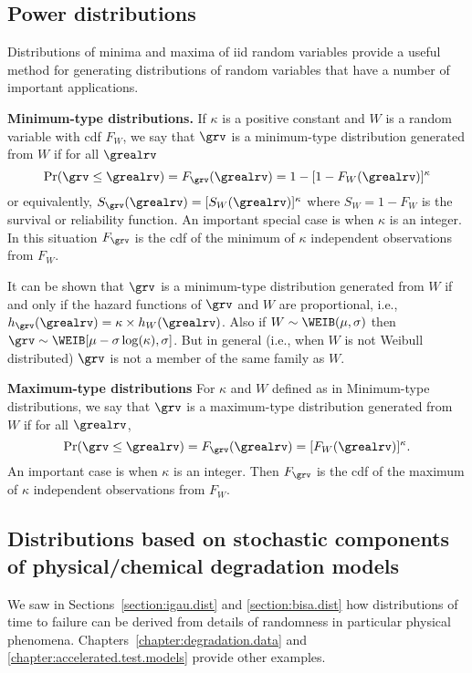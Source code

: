 \subsection{Power distributions}
\label{section:power.dist}
Distributions of minima and maxima of iid random variables provide a
useful method for generating distributions of random variables that
have a number of important applications.

{\bf Minimum-type distributions.}
If ${\kappa}$ is a positive constant and $W$ is a random
variable with cdf $F_{W}$,
we say that $\grv$ is a minimum-type
distribution generated from $W$ if for all $\grealrv$
\begin{displaymath}
\Pr(\grv \le \grealrv)=F_{\grv}(\grealrv)=1-[1 - F_{W}(\grealrv)]^{\kappa}
\end{displaymath}
or equivalently, $S_{\grv}(\grealrv)=[S_{W}(\grealrv)]^{\kappa}$
where $S_{W}=1 - F_{W}$ is the survival or reliability function.  An
important special case is when $\kappa$ is an integer. In this situation
$F_{\grv}$ is the cdf of the minimum of ${\kappa}$ independent
observations from $F_{W}$.


It can be shown that $\grv$ is a minimum-type distribution generated
from $W$ if and only if the hazard functions of $\grv$ and $W$ are
proportional, i.e., $h_{\grv}(\grealrv)=\kappa \times h_{W}(\grealrv)$.
Also if $W \sim \WEIB(\mu, \sigma)$ then $\grv \sim \WEIB[\mu-\sigma
\log(\kappa), \sigma]$. But in general (i.e., 
when $W$ is not Weibull distributed) $\grv$ is not a member of
the same family as $W$.

{\bf Maximum-type distributions} For $\kappa$ and $W$ defined as in
Minimum-type distributions, we say that $\grv$ is a maximum-type
distribution generated from $W$ if for all $\grealrv$,
\begin{displaymath}
\Pr(\grv \le \grealrv)=F_{\grv}(\grealrv)=[F_{W}(\grealrv)]^{\kappa}.
\end{displaymath}
An important case is when $\kappa$ is an integer. Then $F_{\grv}$ is
the cdf of the maximum of $\kappa$ independent observations from 
$F_{W}$.

\subsection{Distributions based on stochastic components of
physical/chemical degradation models} We saw in
Sections~\ref{section:igau.dist} and \ref{section:bisa.dist} how distributions
of time to failure can be derived from details of randomness in
particular physical phenomena.
Chapters~\ref{chapter:degradation.data} and
\ref{chapter:accelerated.test.models} provide other
examples.



